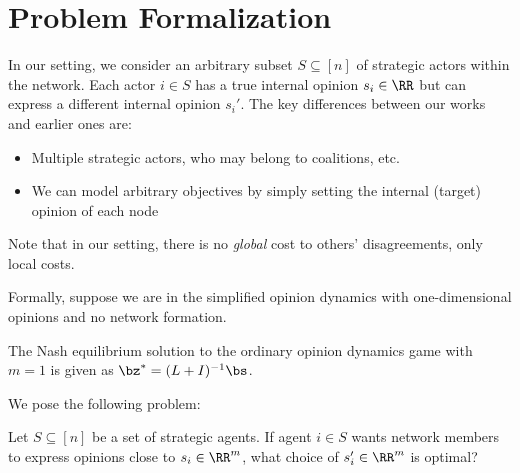 

\section{Problem Formalization} 

In our setting, we consider an arbitrary subset $S \subseteq [n]$ of strategic actors within the network. Each actor $i \in S$ has a true internal opinion $s_i \in \RR$ but can express a different internal opinion $s_i'$. The key differences between our works and earlier ones are: 

\begin{itemize}
    \item Multiple strategic actors, who may belong to coalitions, etc. 
    \item We can model arbitrary objectives by simply setting the internal (target) opinion of each node 
\end{itemize}

Note that in our setting, there is no {\em global} cost to others' disagreements, only local costs. 


Formally, suppose we are in the simplified opinion dynamics with one-dimensional opinions and no network formation. 



\begin{prop}
The Nash equilibrium solution to the ordinary opinion dynamics game with $m = 1$ is given as $\bz^* = (L + I)^{-1} \bs$. 
\end{prop}

We pose the following problem: 


\begin{defn}
Let $S \subseteq [n]$ be a set of strategic agents. If agent $i \in S$ wants network members to express opinions close to $s_i \in \RR^m$, what choice of $s_i^\prime \in \RR^m$ is optimal? 
\end{defn}

